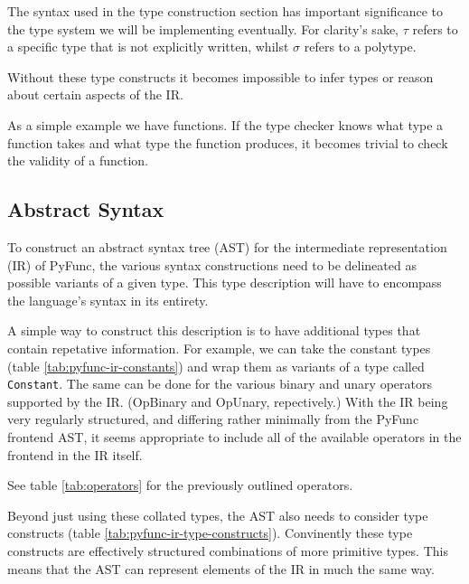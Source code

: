 \documentclass{l4proj}
\begin{document}
The syntax used in the type construction section has important significance to the type system we will be implementing eventually.
For clarity's sake, $\tau$ refers to a specific type that is not explicitly written, whilst $\sigma$ refers to a polytype. 

Without these type constructs it becomes impossible to infer types or reason about certain aspects of the IR.

As a simple example we have functions.
If the type checker knows what type a function takes and what type the function produces, it becomes trivial to check the validity of a function.


\subsection{Abstract Syntax}

To construct an abstract syntax tree (AST) for the intermediate representation (IR) of PyFunc, the various syntax constructions need to be delineated as possible variants of a given type.
This type description will have to encompass the language's syntax in its entirety.

A simple way to construct this description is to have additional types that contain repetative information.
For example, we can take the constant types (table \ref{tab:pyfunc-ir-constants}) and wrap them as variants of a type called \texttt{Constant}.
The same can be done for the various binary and unary operators supported by the IR.
(OpBinary and OpUnary, repectively.)
With the IR being very regularly structured, and differing rather minimally from the PyFunc frontend AST, it seems appropriate to include all of the available operators in the frontend in the IR itself.

See table \ref{tab:operators} for the previously outlined operators.

Beyond just using these collated types, the AST also needs to consider type constructs (table \ref{tab:pyfunc-ir-type-constructs}).
Convinently these type constructs are effectively structured combinations of more primitive types.
This means that the AST can represent elements of the IR in much the same way.
\end{document}
